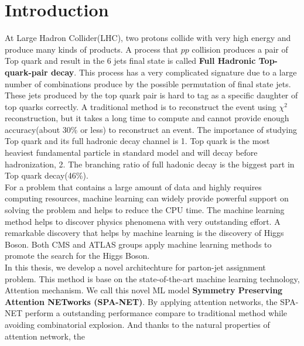 
\chapter{Introduction} 

\newcommand{\comment}[1]{}

At Large Hadron Collider(LHC), two protons collide with very high energy and produce many kinds of products. A process that $pp$ collision produces a pair of Top quark and result in the 6 jets final state is called \textbf{Full Hadronic Top-quark-pair decay}. This process has a very complicated signature due to a large number of combinations produce by the possible permutation of final state jets. These jets produced by the top quark pair is hard to tag as a specific daughter of top quarks correctly. A traditional method is to reconstruct the event using $\chi^{2}$ reconstruction, but it takes a long time to compute and cannot provide enough accuracy(about 30\% or less) to reconstruct an event. The importance of studying Top quark and its full hadronic decay channel is 1. Top quark is the most heaviest  fundamental particle in standard model and will decay before hadronization, 2. The branching ratio of full hadonic decay is the biggest part in Top quark decay(46\%). 
\\
For a problem that contains a large amount of data and highly requires computing resources, machine learning can widely provide powerful support on solving the problem and helps to reduce the CPU time. The machine learning method helps to discover physics phenomena with very outstanding effort. A remarkable discovery that helps by machine learning is the discovery of Higgs Boson. Both CMS and ATLAS groups apply machine learning methods to promote the search for the Higgs Boson. \cite{Aad:2012tfa}\cite{Chatrchyan:2012ufa}
\\
In this thesis, we develop a novel architechture for parton-jet assignment problem. This method is base on the state-of-the-art machine learning technology, Attention mechanism.\cite{A.Vaswani:2017} We call this novel ML model \textbf{Symmetry Preserving Attention NETworks (SPA-NET)}. By applying attention networks, the SPA-NET perform a outstanding performance compare to traditional method while avoiding combinatorial explosion. And thanks to the natural properties of attention network, the 

